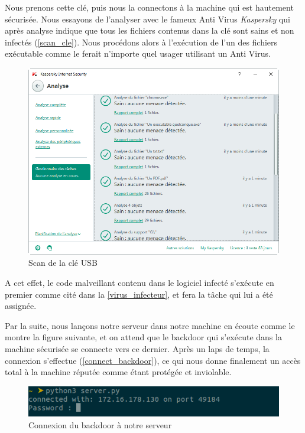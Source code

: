 Nous prenons cette clé, puis nous la connectons à la machine qui est hautement sécurisée. Nous essayons de l'analyser avec le fameux Anti Virus \emph{Kaspersky} qui après analyse indique que tous les fichiers contenus dans la clé sont sains et non infectés (\autoref{scan_cle}). Nous procédons alors à l’exécution de l'un des fichiers exécutable comme le ferait n'importe quel usager utilisant un Anti Virus.

\begin{figure}[H]
    \centering
    \includegraphics[width=\linewidth]{images/scan_by_antivirus.png}
    \caption{Scan de la clé USB}
    \label{scan_cle}
\end{figure}

A cet effet, le code malveillant contenu dans le logiciel infecté s’exécute en premier comme cité dans la 
\autoref{virus_infecteur}, et fera la tâche qui lui a été assignée.

Par la suite, nous lançons  notre serveur dans notre machine en écoute comme le montre la figure suivante, et on attend que le backdoor qui s’exécute dans la machine sécurisée se connecte vers ce dernier. Après un laps de temps, la connexion s'effectue (\autoref{connect_backdoor}), ce qui nous donne finalement un accès total à la machine réputée comme étant protégée et inviolable.

\begin{figure}[H]
    \centering
    \includegraphics[width=\linewidth]{images/backdoor_connect.png}
    \caption{Connexion du backdoor à notre serveur}
    \label{connect_backdoor}
\end{figure}

